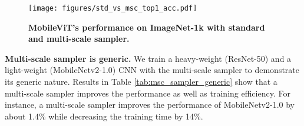 \documentclass[preprint]{article} \usepackage{iclr2022_conference,times}
\newcommand{\arch}{MobileViT}
\begin{document}
\begin{figure}
    \centering
    \texttt{[image: figures/std\_vs\_msc\_top1\_acc.pdf]}
    \caption{\textbf{\arch's performance on ImageNet-1k with standard and multi-scale sampler.}}
    \label{fig:acc_compare_sampler}
\end{figure}

\textbf{Multi-scale sampler is generic.} We train a heavy-weight (ResNet-50) and a light-weight (MobileNetv2-1.0) CNN with the multi-scale sampler to demonstrate its generic nature. Results in Table \ref{tab:msc_sampler_generic} show that a multi-scale sampler improves the performance as well as training efficiency. For instance, a multi-scale sampler improves the performance of MobileNetv2-1.0 by about 1.4\% while decreasing the training time by 14\%.

\begin{table}[t!]
    \centering
    \caption{\textbf{Multi-scale sampler is generic.} All models are trained with basic augmentation on the ImageNet-1k. Results are with exponential moving average.}
    \label{tab:msc_sampler_generic}
\end{table}
\end{document}
